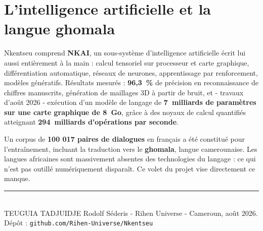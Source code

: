\documentclass[11pt, a4paper, oneside]{article}
\begin{document}
\section{L'intelligence artificielle et la langue ghomala}

Nkentseu comprend \textbf{NKAI}, un sous-système d'intelligence artificielle
écrit lui aussi entièrement à la main : calcul tensoriel sur processeur et carte
graphique, différentiation automatique, réseaux de neurones, apprentissage par
renforcement, modèles génératifs. Résultats mesurés : \textbf{96,3~\%} de
précision en reconnaissance de chiffres manuscrits, génération de maillages 3D à
partir de bruit, et - travaux d'août 2026 - exécution d'un modèle de langage de
\textbf{7~milliards de paramètres sur une carte graphique de 8~Go}, grâce à des
noyaux de calcul quantifiés atteignant \textbf{294~milliards d'opérations par
seconde}.

\vspace{4pt}
Un corpus de \textbf{100 017 paires de dialogues} en français a été constitué
pour l'entraînement, incluant la traduction vers le \textbf{ghomala}, langue
camerounaise. Les langues africaines sont massivement absentes des technologies
du langage : ce qui n'est pas outillé numériquement disparaît. Ce volet du
projet vise directement ce manque.

\vfill
\noindent\rule{\textwidth}{0.4pt}\\
{\footnotesize\color{grisTexte}
TEUGUIA TADJUIDJE Rodolf Séderis - Rihen Universe - Cameroun, août 2026.\hfill
Dépôt : \texttt{github.com/Rihen-Universe/Nkentseu}}
\end{document}
